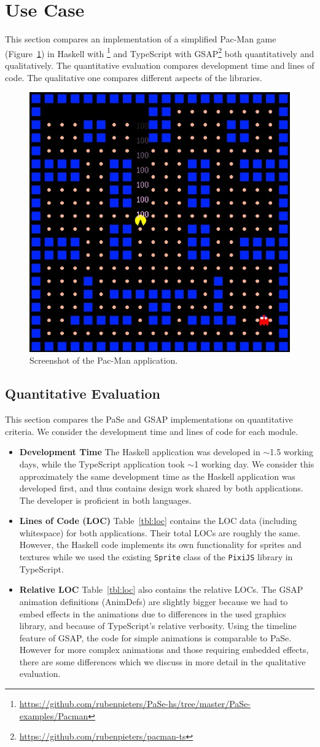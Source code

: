 \section{Use Case}

This section compares an implementation of a simplified Pac-Man game (Figure~\ref{fig:pacman}) in Haskell
with \dsl{}\footnote{\url{https://github.com/rubenpieters/PaSe-hs/tree/master/PaSe-examples/Pacman}} and TypeScript with GSAP\footnote{\url{https://github.com/rubenpieters/pacman-ts}} both quantitatively and qualitatively. The
quantitative evaluation compares development time and lines
of code. The qualitative one compares different aspects of the 
libraries.

\begin{figure}[h]
\centering
\includegraphics[width=.3\textwidth]{pictures/pacman}
\caption{Screenshot of the Pac-Man application.}
\label{fig:pacman}
\end{figure}

\subsection{Quantitative Evaluation}

This section compares the PaSe and GSAP implementations on
quantitative criteria. We consider the development time and lines of code for
each module.

\begin{itemize}
\item \textbf{Development Time} The Haskell application was developed in
$\sim$1.5 working days, while the TypeScript application took $\sim$1 working
day. We consider this approximately the same development time as the Haskell application
was developed first, and thus contains design work shared by both
applications. The developer is proficient in both languages.
\item \textbf{Lines of Code (LOC)} Table~\ref{tbl:loc} contains the LOC data
(including whitespace) for both applications. Their total LOCs are roughly the same. However, the Haskell
code implements its own functionality for sprites and
textures while we used the existing
\texttt{Sprite} class of the \texttt{PixiJS} library in TypeScript.
\item \textbf{Relative LOC} Table~\ref{tbl:loc} also contains the relative
LOCs. The GSAP animation definitions (AnimDefs) are slightly bigger because
we had to embed effects in the animations due to differences
in the used graphics library, and because of TypeScript's relative verbosity.
Using the timeline feature of GSAP, the code for
simple animations is comparable to PaSe. However for more complex animations
and those requiring embedded effects, there are some differences which we
discuss in more detail in the qualitative evaluation.
\end{itemize}

